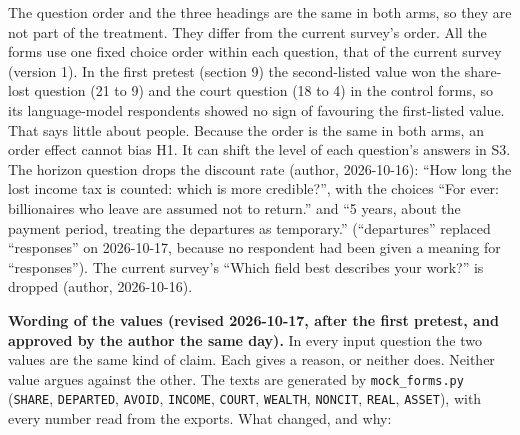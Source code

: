 The question order and the three headings are the same in both arms, so they are not part of the
treatment. They differ from the current survey's order. All the forms use one fixed choice order
within each question, that of the current survey (version 1). In the first pretest (section 9) the
second-listed value won the share-lost question (21 to 9) and the court question (18 to 4) in the
control forms, so its language-model respondents showed no sign of favouring the first-listed
value. That says little about people. Because the order is the same in both arms, an order effect
cannot bias H1. It can shift the level of each question's answers in S3. The horizon question drops the
discount rate (author, 2026-10-16): ``How long the lost income tax is counted: which is more
credible?'', with the choices ``For ever: billionaires who leave are assumed not to return.'' and ``5
years, about the payment period, treating the departures as temporary.'' (``departures'' replaced
``responses'' on 2026-10-17, because no respondent had been given a meaning for ``responses''). The current survey's
``Which field best describes your work?'' is dropped (author, 2026-10-16).

\textbf{Wording of the values (revised 2026-10-17, after the first pretest, and approved by the author
the same day).} In every input question the two values are the same kind of claim. Each gives a
reason, or neither does. Neither value argues against the other. The texts are generated by
\texttt{mock\_forms.py} (\texttt{SHARE}, \texttt{DEPARTED}, \texttt{AVOID}, \texttt{INCOME}, \texttt{COURT}, \texttt{WEALTH}, \texttt{NONCIT}, \texttt{REAL},
\texttt{ASSET}), with every number read from the exports. What changed, and why:


